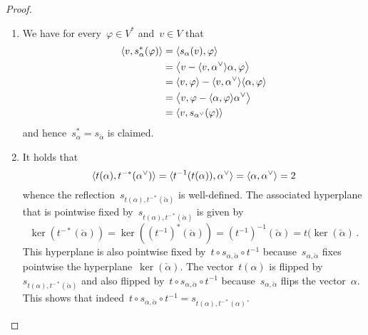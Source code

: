 \begin{proof}
  \leavevmode
  \begin{enumerate}
    \item
      We have for every~$\varphi \in V^*$ and~$v \in V$ that
      \begin{align*}
        \pair{v, s_\alpha^*(\varphi)}
        &=
        \pair{s_\alpha(v), \varphi}
        \\
        &=
        \pair[\big]{v - \pair{v, \check{\alpha}} \alpha, \varphi}
        \\
        &=
        \pair{v, \varphi} - \pair{v, \check{\alpha}} \pair{\alpha, \varphi}
        \\
        &=
        \pair[\big]{v, \varphi - \pair{\alpha, \varphi} \check{\alpha}}
        \\
        &=
        \pair{v, s_{\check{\alpha}}(\varphi)}
      \end{align*}
      and hence~$s_\alpha^* = s_{\check{\alpha}}$ is claimed.
    \item
      It holds that
      \[
        \pair{t(\alpha), t^{-*}(\check{\alpha})}
        =
        \pair{t^{-1}(t(\alpha)), \check{\alpha}}
        =
        \pair{\alpha, \check{\alpha}}
        =
        2
      \]
      whence the reflection~$s_{t(\alpha), t^{-*}(\check{\alpha})}$ is well-defined.
      The associated hyperplane that is pointwise fixed by~$s_{t(\alpha), t^{-*}(\check{\alpha})}$ is given by
      \[
        \ker(t^{-*}(\check{\alpha}))
        =
        \ker((t^{-1})^*(\check{\alpha}))
        =
        (t^{-1})^{-1}(\check{\alpha})
        =
        t(\ker(\check{\alpha}) \,.
      \]
      This hyperplane is also pointwise fixed by~$t \circ s_{\alpha, \check{\alpha}} \circ t^{-1}$ because~$s_{\alpha, \check{\alpha}}$ fixes pointwise the hyperplane~$\ker(\check{\alpha})$.
      The vector~$t(\alpha)$ is flipped by~$s_{t(\alpha), t^{-*}(\check{\alpha})}$ and also flipped by~$t \circ s_{\alpha, \check{\alpha}} \circ t^{-1}$ because~$s_{\alpha, \check{\alpha}}$ flips the vector~$\alpha$.
      This shows that indeed~$t \circ s_{\alpha, \check{\alpha}} \circ t^{-1} = s_{t(\alpha), t^{-*}(\alpha)}$.
    \qedhere
  \end{enumerate}
\end{proof}

% 

